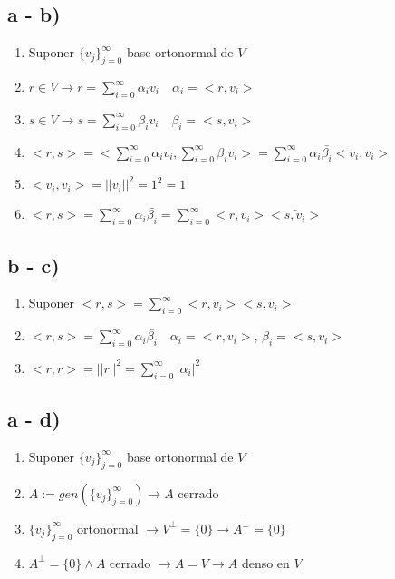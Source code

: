 \subsection*{a - b)}

\begin{enumerate}
  \item Suponer $\{v_j\}_{j=0}^\infty$ base ortonormal de $V$
  \item $r \in V \to r = \sum_{i=0}^\infty \alpha_i v_i \quad \alpha_i = <r,v_i>$
  \item $s \in V \to s = \sum_{i=0}^\infty \beta_i v_i \quad \beta_i = <s,v_i>$
  \item $<r,s> = <\sum_{i=0}^\infty \alpha_i v_i, \sum_{i=0}^\infty \beta_i v_i> = \sum_{i=0}^\infty \alpha_i \bar{\beta_i} <v_i, v_i>$
  \item $<v_i, v_i> = ||v_i||^2 = 1^2 = 1$
  \item $<r,s> = \sum_{i=0}^\infty \alpha_i \bar{\beta_i} = \sum_{i=0}^\infty <r,v_i> \bar{<s,v_i>}$
\end{enumerate}

\subsection*{b - c)}
\begin{enumerate}
  \item Suponer $<r,s> = \sum_{i=0}^\infty <r,v_i> \bar{<s,v_i>}$
  \item $<r,s> = \sum_{i=0}^\infty \alpha_i \bar{\beta_i} \quad \alpha_i = <r,v_i>$, $\beta_i = <s, v_i>$
  \item $<r,r> = ||r||^2 = \sum_{i=0}^\infty |\alpha_i|^2$
\end{enumerate}

\subsection*{a - d)}

\begin{enumerate}
	\item Suponer $\{v_j\}_{j=0}^\infty$ base ortonormal de $V$
  \item $A := gen(\{v_j\}_{j=0}^\infty) \to A$ cerrado
  \item $\{v_j\}_{j=0}^\infty$ ortonormal $\to V^\perp = \{0\} \to A^\perp = \{0\}$
  \item $A^\perp = \{0\} \land A$ cerrado $\to A = V \to A$ denso en $V$
\end{enumerate}

